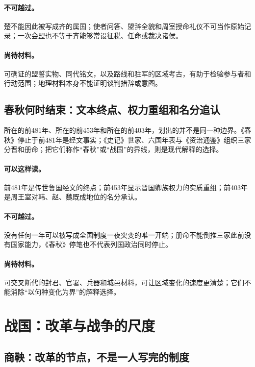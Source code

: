 \paragraph{不可越过。}楚不能因此被写成齐的属国；使者问答、盟辞全貌和周室授命礼仪不可当作原始记录；一次会盟也不等于齐能够常设征税、任命或裁决诸侯。

\paragraph{尚待材料。}可确证的盟誓实物、同代铭文，以及路线和驻军的区域考古，有助于检验参与者和行动范围；地理材料本身不能证明谈判措辞或意图。

\subsection{春秋何时结束：文本终点、权力重组和名分追认}

所在的前481年、所在的前453年和所在的前403年，划出的并不是同一种边界。《春秋》停止于前481年是经文事实；《史记》世家、六国年表与《资治通鉴》组织三家分晋和册命；把它们称作“春秋”或“战国”的界线，则是现代解释的选择。

\paragraph{可以这样读。}前481年是传世鲁国经文的终点；前453年显示晋国卿族权力的实质重组；前403年是周王室对韩、赵、魏既成地位的名分承认。

\paragraph{不可越过。}没有任何一年可以被写成全国制度一夜突变的唯一开端；册命不能倒推三家此前没有国家能力，《春秋》停笔也不代表列国政治同时停止。

\paragraph{尚待材料。}可交叉断代的封君、官署、兵器和城邑材料，可让区域变化的速度更清楚；它们不能消除“以何种变化为界”的解释选择。

\section{战国：改革与战争的尺度}

\subsection{商鞅：改革的节点，不是一人写完的制度}

